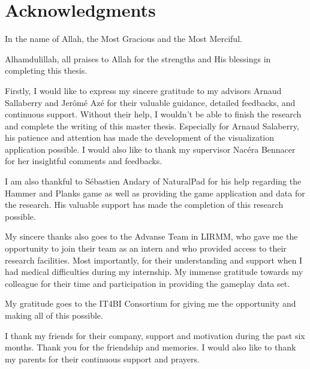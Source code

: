 \documentclass[a4paper,11pt,twoside]{ThesisStyle}
\begin{document}
\cleardoublepage

\section*{Acknowledgments}

In the name of Allah, the Most Gracious and the Most Merciful.

Alhamdulillah, all praises to Allah for the strengths and His blessings in completing this thesis.

Firstly, I would like to express my sincere gratitude to my advisors Arnaud Sallaberry and Jer\^{o}m\'{e} Az\'{e} for their valuable guidance, detailed feedbacks, and continuous support. Without their help, I wouldn't be able to finish the research and complete the writing of this master thesis. Especially for Arnaud Salaberry, his patience and attention has made the development of the visualization application possible. I would also like to thank my supervisor  Nac\'{e}ra Bennacer for her insightful comments and feedbacks.

I am also thankful to S\'{e}bastien Andary of NaturalPad for his help regarding the Hammer and Planks game as well as providing the game application and data for the research. His valuable support has made the completion of this research possible.

My sincere thanks also goes to the Advanse Team in LIRMM, who gave me the opportunity to join their team as an intern and who provided access to their research facilities. Most importantly, for their understanding and support when I had medical difficulties during my internship.
My immense gratitude towards my colleague for their time and participation in providing the gameplay data set.


My gratitude goes to the IT4BI Consortium for giving me the opportunity and making all of this possible. 

I thank my friends for their company, support and motivation during the past six months. Thank you for the friendship and memories. I would also like to thank my parents for their continuous support and prayers.  

\end{document}

